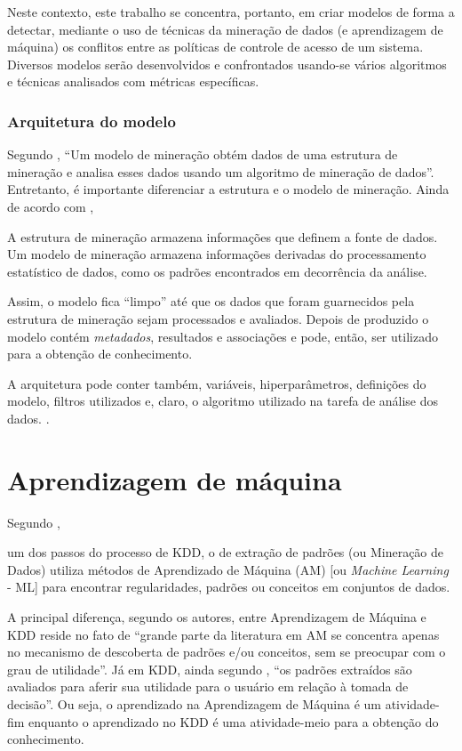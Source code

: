 Neste contexto, este trabalho se concentra, portanto, em criar modelos de forma a detectar, mediante o uso de técnicas da mineração de dados (e aprendizagem de máquina) os conflitos entre as políticas de controle de acesso de um sistema. Diversos modelos serão desenvolvidos e confrontados usando-se vários algoritmos e técnicas analisados com métricas específicas.

\subsubsection{Arquitetura do modelo}\label{arquitetura_modelo}

Segundo , ``Um modelo de mineração obtém dados de uma estrutura de mineração e analisa esses dados usando um algoritmo de mineração de dados''. Entretanto, é importante diferenciar a estrutura e o modelo de mineração. Ainda de acordo com , \begin{citacao}
	A estrutura de mineração armazena informações que definem a fonte de dados. Um modelo de mineração armazena informações derivadas do processamento estatístico de dados, como os padrões encontrados em decorrência da análise.
\end{citacao}

Assim, o modelo fica ``limpo'' até que os dados que foram guarnecidos pela estrutura de mineração sejam processados e avaliados. Depois de produzido o modelo contém \textit{metadados}, resultados e associações e pode, então, ser utilizado para a obtenção de conhecimento.

A arquitetura pode conter também, variáveis, hiperparâmetros, definições do modelo, filtros utilizados e, claro, o algoritmo utilizado na tarefa de análise dos dados. \cite{deep_learning_book_2019}.

\section{Aprendizagem de máquina} \label{aprendizagem_maquina}
Segundo , \begin{citacao}
	um dos passos do processo de KDD, o de extração de padrões (ou Mineração de Dados) utiliza métodos de Aprendizado de Máquina (AM) [ou \textit{Machine Learning} - ML] para encontrar regularidades, padrões ou conceitos em conjuntos de dados.
\end{citacao}

A principal diferença, segundo os autores, \cite{goldschmidt2005} entre Aprendizagem de Máquina e KDD reside no fato de ``grande parte da literatura em AM se concentra apenas no mecanismo de descoberta de padrões e/ou conceitos, sem se preocupar com o grau de utilidade''. Já em KDD, ainda segundo \cite{goldschmidt2005}, ``os padrões extraídos são avaliados para aferir sua utilidade para o usuário em relação à tomada de decisão''. Ou seja, o aprendizado na Aprendizagem de Máquina é um atividade-fim enquanto o aprendizado no KDD é uma atividade-meio para a obtenção do conhecimento.

